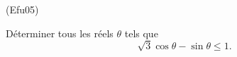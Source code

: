 \begin{tiny}(Efu05)\end{tiny} D{\'e}terminer tous les r{\'e}els $\theta$ tels que
\begin{displaymath}
 \sqrt{3}\cos \theta - \sin \theta \leq 1.
\end{displaymath}
